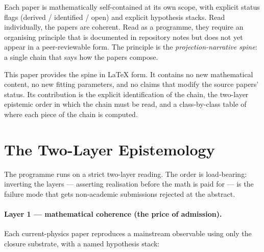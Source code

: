 \documentclass[12pt]{article}
\begin{document}
Each paper is mathematically self-contained at its own scope, with explicit status flags (derived / identified / open) and explicit hypothesis stacks. Read individually, the papers are coherent. Read as a programme, they require an organising principle that is documented in repository notes but does not yet appear in a peer-reviewable form. The principle is the \emph{projection-narrative spine}: a single chain that says how the papers compose.

This paper provides the spine in LaTeX form. It contains no new mathematical content, no new fitting parameters, and no claims that modify the source papers' status. Its contribution is the explicit identification of the chain, the two-layer epistemic order in which the chain must be read, and a class-by-class table of where each piece of the chain is computed.

\section{The Two-Layer Epistemology}\label{sec:two_layer}

The programme runs on a strict two-layer reading. The order is load-bearing: inverting the layers --- asserting realisation before the math is paid for --- is the failure mode that gets non-academic submissions rejected at the abstract.

\paragraph{Layer 1 --- mathematical coherence (the price of admission).}
Each current-physics paper reproduces a mainstream observable using only the closure substrate, with a named hypothesis stack:
\end{document}
